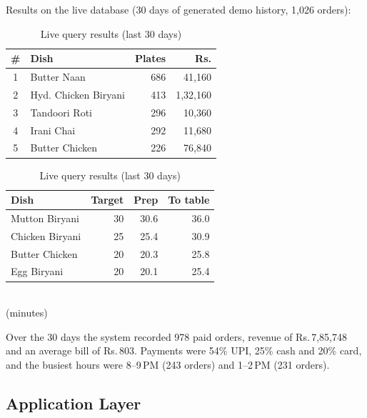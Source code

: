 \documentclass[11pt,a4paper]{report}
\begin{document}
Results on the live database (30 days of generated demo history, 1,026 orders):
\begin{table}[H]
    \centering
    \caption{Live query results (last 30 days)}
    \footnotesize
    \begin{minipage}[t]{0.48\textwidth}\centering
    \begin{tabular}{|c|l|r|r|}
        \hline
        \textbf{\#} & \textbf{Dish} & \textbf{Plates} & \textbf{Rs.} \\ \hline
        1 & Butter Naan & 686 & 41,160 \\ \hline
        2 & Hyd. Chicken Biryani & 413 & 1,32,160 \\ \hline
        3 & Tandoori Roti & 296 & 10,360 \\ \hline
        4 & Irani Chai & 292 & 11,680 \\ \hline
        5 & Butter Chicken & 226 & 76,840 \\ \hline
    \end{tabular}
    \end{minipage}\hfill
    \begin{minipage}[t]{0.48\textwidth}\centering
    \begin{tabular}{|l|r|r|r|}
        \hline
        \textbf{Dish} & \textbf{Target} & \textbf{Prep} & \textbf{To table} \\ \hline
        Mutton Biryani & 30 & 30.6 & 36.0 \\ \hline
        Chicken Biryani & 25 & 25.4 & 30.9 \\ \hline
        Butter Chicken & 20 & 20.3 & 25.8 \\ \hline
        Egg Biryani & 20 & 20.1 & 25.4 \\ \hline
    \end{tabular}\\[1mm]
    {\scriptsize (minutes)}
    \end{minipage}
\end{table}
Over the 30 days the system recorded 978 paid orders, revenue of Rs.\,7,85,748 and an average bill of Rs.\,803. Payments were 54\% UPI, 25\% cash and 20\% card, and the busiest hours were 8--9\,PM (243 orders) and 1--2\,PM (231 orders).

\subsection{Application Layer}
\end{document}
